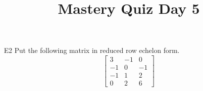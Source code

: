 \documentclass{sbgLAquiz}
\title{Mastery Quiz Day 5 }
\begin{document}
\begin{problem}{E2}
Put the following matrix in reduced row echelon form.
$$\begin{bmatrix}
 3 & -1 & 0 \\
 -1 & 0 & -1 \\
 -1 & 1 & 2 \\
 0 & 2 & 6
\end{bmatrix}$$
\end{problem}
\end{document}
